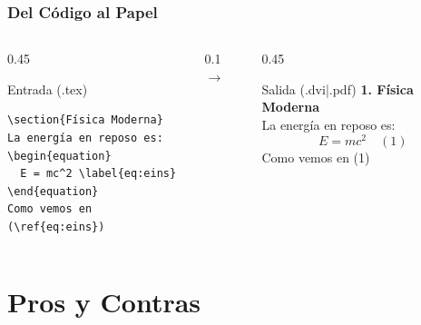 \documentclass[12pt,aspectratio=169,ignorenonframetext]{ltxbeamer}
\begin{document}
\begin{frame}[fragile]
\frametitle{Del Código al Papel}
\begin{columns}
    \begin{column}{0.45\textwidth}
        \begin{block}{Entrada (.tex)}
            \begin{verbatim}
\section{Física Moderna}
La energía en reposo es:
\begin{equation}
  E = mc^2 \label{eq:eins}
\end{equation}
Como vemos en (\ref{eq:eins})
            \end{verbatim}
        \end{block}
    \end{column}
    \pause

    \begin{column}{0.1\textwidth}
        \centering $\rightarrow$
    \end{column}

    \begin{column}{0.45\textwidth}
        \begin{exampleblock}{Salida (.dvi|.pdf)}
            \lmr
            \textbf{\Large 1. Física Moderna}\\
            \vspace{0.2cm}
            La energía en reposo es:
            \begin{equation*}
                E = mc^2 \quad (1)
            \end{equation*}
            Como vemos en (1)
        \end{exampleblock}
    \end{column}
\end{columns}
\end{frame}



\section{Pros y Contras}
\end{document}
